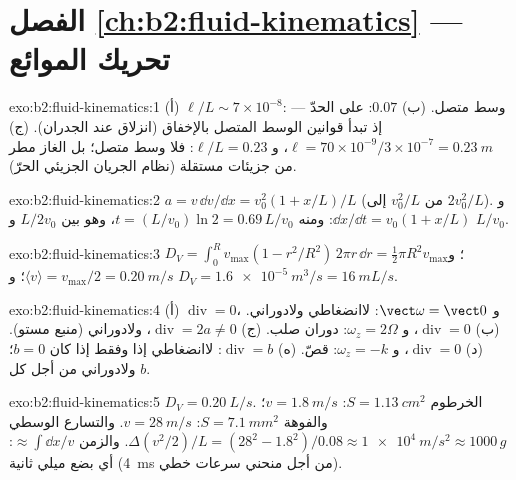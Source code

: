 \section*{الفصل \ref{ch:b2:fluid-kinematics} --- تحريك الموائع}

\begin{solution}{exo:b2:fluid-kinematics:1}
(أ) $\ell/L \sim 7 \times 10^{-8}$: وسط متصل. (ب) $0.07$: على الحدّ ---
إذ تبدأ قوانين الوسط المتصل بالإخفاق (انزلاق عند الجدران). (ج) $\ell = 70 \times 10^{-9}
/3 \times 10^{-7} = \qty{0.23}{m}$، و $\ell/L = 0.23$: فلا وسط متصل؛ بل الغاز
مطر من جزيئات مستقلة (نظام الجريان الجزيئي الحرّ).
\end{solution}

\begin{solution}{exo:b2:fluid-kinematics:2}
$a = v\,\dd v/\dd x = v_0^2(1 + x/L)/L$ (من $v_0^2/L$ إلى $2v_0^2/L$).
و $\dd x/\dd t = v_0(1 + x/L)$: ومنه $t = (L/v_0)\ln2 = 0.69\,L/v_0$، وهو بين
$L/2v_0$ و $L/v_0$.
\end{solution}

\begin{solution}{exo:b2:fluid-kinematics:3}
$D_V = \int_0^Rv_{\max}(1 - r^2/R^2)\,2\pi r\,\dd r = \tfrac12\pi R^2v_{\max}$؛
و $\langle v\rangle = v_{\max}/2 = \qty{0.20}{m/s}$؛ و $D_V = \qty{1.6e-5}{m^3/s} =
\qty{16}{mL/s}$.
\end{solution}

\begin{solution}{exo:b2:fluid-kinematics:4}
(أ) $\operatorname{div} = 0$، و $\vect\omega = \vect 0$: لاانضغاطي
ولادوراني. (ب) $\operatorname{div} = 0$، و $\omega_z = 2\Omega$: دوران
صلب. (ج) $\operatorname{div} = 2a \ne 0$، ولادوراني (منبع
مستو). (د) $\operatorname{div} = 0$، و $\omega_z = -k$: قصّ. (ه)
$\operatorname{div} = b$: لاانضغاطي إذا وفقط إذا كان $b = 0$؛ ولادوراني من
أجل كل $b$.
\end{solution}

\begin{solution}{exo:b2:fluid-kinematics:5}
$D_V = \qty{0.20}{L/s}$. الخرطوم $S = \qty{1.13}{cm^2}$: $v = \qty{1.8}{m/s}$؛ والفوهة
$S = \qty{7.1}{mm^2}$: $v = \qty{28}{m/s}$. والتسارع الوسطي $\Delta(v^2/2)/L
= (28^2 - 1.8^2)/0.08 \approx \qty{1e4}{m/s^2} \approx 1000\,g$. والزمن $\approx
\int\dd x/v$: أي بضع ميلي ثانية (\qty{4}{ms} من أجل منحني سرعات خطي).
\end{solution}


